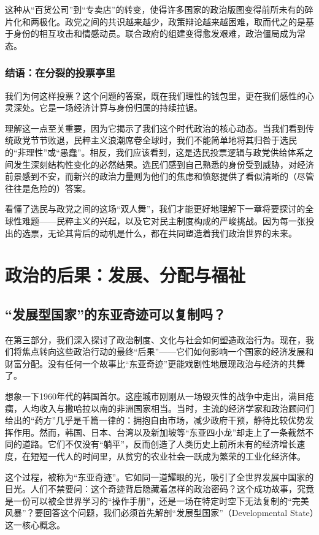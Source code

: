 \documentclass[a5paper, 11pt, openany]{ctexbook}
\begin{document}
这种从“百货公司”到“专卖店”的转变，使得许多国家的政治版图变得前所未有的碎片化和两极化。政党之间的共识越来越少，政策辩论越来越困难，取而代之的是基于身份的相互攻击和情感动员。联合政府的组建变得愈发艰难，政治僵局成为常态。

\section*{结语：在分裂的投票亭里}

我们为何这样投票？这个问题的答案，既在我们理性的钱包里，更在我们感性的心灵深处。它是一场经济计算与身份归属的持续拉锯。

理解这一点至关重要，因为它揭示了我们这个时代政治的核心动态。当我们看到传统政党节节败退，民粹主义浪潮席卷全球时，我们不能简单地将其归咎于选民的“非理性”或“愚蠢”。相反，我们应该看到，这是选民投票逻辑与政党供给体系之间发生深刻结构性变化的必然结果。选民们感到自己熟悉的身份受到威胁，对经济前景感到不安，而新兴的政治力量则为他们的焦虑和愤怒提供了看似清晰的（尽管往往是危险的）答案。

看懂了选民与政党之间的这场“双人舞”，我们才能更好地理解下一章将要探讨的全球性难题——民粹主义的兴起，以及它对民主制度构成的严峻挑战。因为每一张投出的选票，无论其背后的动机是什么，都在共同塑造着我们政治世界的未来。


\part{政治的后果：发展、分配与福祉}

\chapter{“发展型国家”的东亚奇迹可以复制吗？}

在第三部分，我们深入探讨了政治制度、文化与社会如何塑造政治行为。现在，我们将焦点转向这些政治行动的最终“后果”——它们如何影响一个国家的经济发展和财富分配。没有任何一个故事比“东亚奇迹”更能戏剧性地展现政治与经济的共舞了。

想象一下1960年代的韩国首尔。这座城市刚刚从一场毁灭性的战争中走出，满目疮痍，人均收入与撒哈拉以南的非洲国家相当。当时，主流的经济学家和政治顾问们给出的“药方”几乎是千篇一律的：拥抱自由市场，减少政府干预，静待比较优势发挥作用。然而，韩国、日本、台湾以及新加坡等“东亚四小龙”却走上了一条截然不同的道路。它们不仅没有“躺平”，反而创造了人类历史上前所未有的经济增长速度，在短短一代人的时间里，从贫穷的农业社会一跃成为繁荣的工业化经济体。

这个过程，被称为“东亚奇迹”。它如同一道耀眼的光，吸引了全世界发展中国家的目光。人们不禁要问：这个奇迹背后隐藏着怎样的政治密码？这个成功故事，究竟是一份可以被全世界学习的“操作手册”，还是一场在特定时空下无法复制的“完美风暴”？要回答这个问题，我们必须首先解剖“发展型国家”（Developmental State）这一核心概念。
\end{document}
